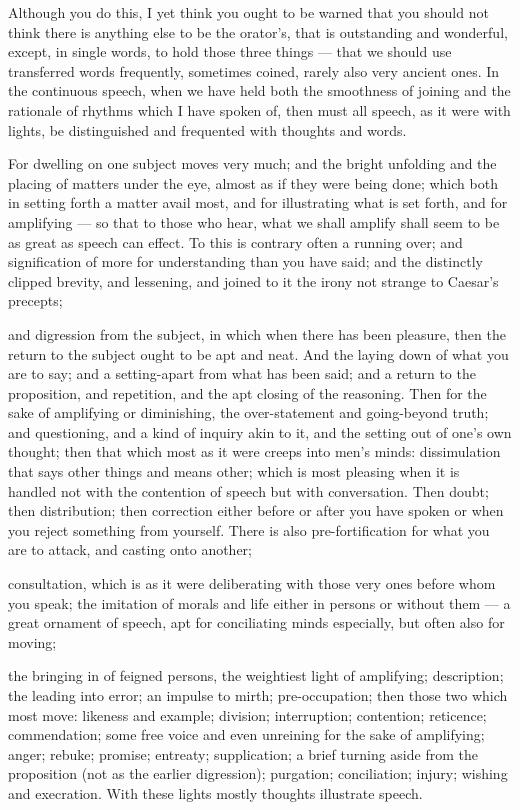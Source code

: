  Although you do this, I yet think you ought to be warned that you should not think there is anything else to be the orator's, that is outstanding and wonderful, except, in single words, to hold those three things — that we should use transferred words frequently, sometimes coined, rarely also very ancient ones. In the continuous speech, when we have held both the smoothness of joining and the rationale of rhythms which I have spoken of, then must all speech, as it were with lights, be distinguished and frequented with thoughts and words.

 For dwelling on one subject moves very much; and the bright unfolding and the placing of matters under the eye, almost as if they were being done; which both in setting forth a matter avail most, and for illustrating what is set forth, and for amplifying — so that to those who hear, what we shall amplify shall seem to be as great as speech can effect. To this is contrary often a running over; and signification of more for understanding than you have said; and the distinctly clipped brevity, and lessening, and joined to it the irony not strange to Caesar's precepts;

 and digression from the subject, in which when there has been pleasure, then the return to the subject ought to be apt and neat. And the laying down of what you are to say; and a setting-apart from what has been said; and a return to the proposition, and repetition, and the apt closing of the reasoning. Then for the sake of amplifying or diminishing, the over-statement and going-beyond truth; and questioning, and a kind of inquiry akin to it, and the setting out of one's own thought; then that which most as it were creeps into men's minds: dissimulation that says other things and means other; which is most pleasing when it is handled not with the contention of speech but with conversation. Then doubt; then distribution; then correction either before or after you have spoken or when you reject something from yourself. There is also pre-fortification for what you are to attack, and casting onto another;

 consultation, which is as it were deliberating with those very ones before whom you speak; the imitation of morals and life either in persons or without them — a great ornament of speech, apt for conciliating minds especially, but often also for moving;

 the bringing in of feigned persons, the weightiest light of amplifying; description; the leading into error; an impulse to mirth; pre-occupation; then those two which most move: likeness and example; division; interruption; contention; reticence; commendation; some free voice and even unreining for the sake of amplifying; anger; rebuke; promise; entreaty; supplication; a brief turning aside from the proposition (not as the earlier digression); purgation; conciliation; injury; wishing and execration. With these lights mostly thoughts illustrate speech.

